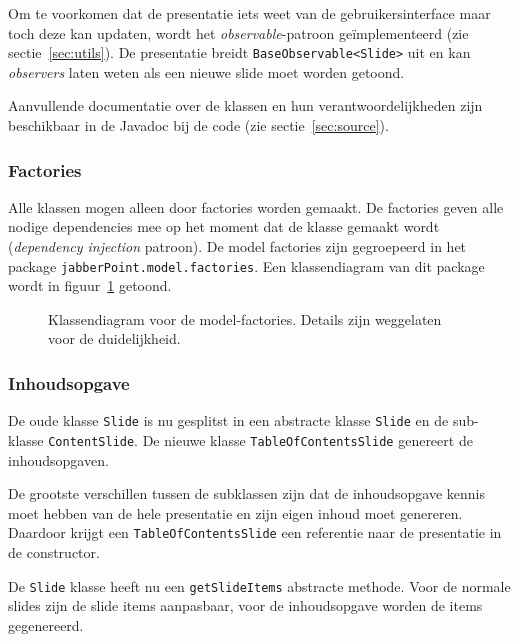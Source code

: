 \documentclass[a4paper]{article}
\newcommand{\code}[1]{\lstinline[columns=fixed]{#1}}
\newcommand{\diagram}[3][1.3]{
	\begin{figure}[!htb]
	 \caption{#3}
	 \label{diagram:#2}
	 \makebox[\textwidth][c]{\texttt{[image: Diagrams/\#2.pdf]}}%
	\end{figure}
}
\begin{document}
		Om te voorkomen dat de presentatie iets weet van de gebruikersinterface maar toch deze kan updaten, wordt het \textit{observable}-patroon geïmplementeerd (zie sectie~\ref{sec:utils}).
		De presentatie breidt \code{BaseObservable<Slide>} uit en kan \textit{observers} laten weten als een nieuwe slide moet worden getoond.

		Aanvullende documentatie over de klassen en hun verantwoordelijkheden zijn beschikbaar in de Javadoc bij de code (zie sectie~\ref{sec:source}).
		
		\subsubsection{Factories}\label{sec:model-factories}
			Alle klassen mogen alleen door factories worden gemaakt.
			De factories geven alle nodige dependencies mee op het moment dat de klasse gemaakt wordt (\textit{dependency injection} patroon).
			De model factories zijn gegroepeerd in het package \code{jabberPoint.model.factories}.
			Een klassendiagram van dit package wordt in figuur~\ref{diagram:model-factories} getoond.

			\diagram[1.2]{model-factories}{
				Klassendiagram voor de model-factories.
				Details zijn weggelaten voor de duidelijkheid.
			}

		\subsubsection{Inhoudsopgave}
			De oude klasse \code{Slide} is nu gesplitst in een abstracte klasse \code{Slide} en de sub-klasse \code{ContentSlide}.
			De nieuwe klasse \code{TableOfContentsSlide} genereert de inhoudsopgaven.

			De grootste verschillen tussen de subklassen zijn dat de inhoudsopgave kennis moet hebben van de hele presentatie en zijn eigen inhoud moet genereren.
			Daardoor krijgt een \code{TableOfContentsSlide} een referentie naar de presentatie in de constructor.

			De \code{Slide} klasse heeft nu een \code{getSlideItems} abstracte methode.
			Voor de normale slides zijn de slide items aanpasbaar, voor de inhoudsopgave worden de items gegenereerd.
\end{document}
